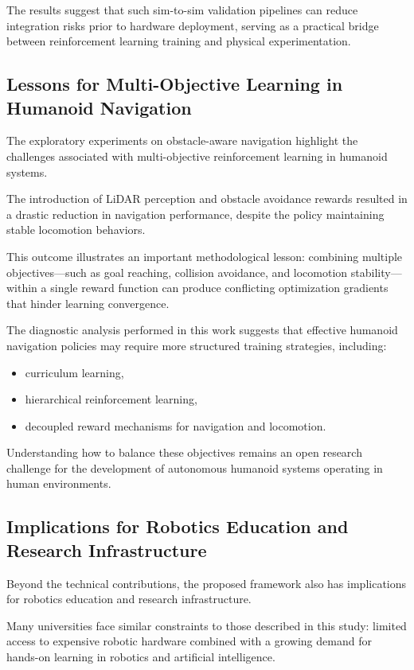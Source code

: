 \documentclass[pdflatex,sn-mathphys-num]{sn-jnl}%
\theoremstyle{thmstyleone}%
\theoremstyle{thmstyletwo}%
\theoremstyle{thmstylethree}%
\begin{document}
The results suggest that such sim-to-sim validation pipelines can reduce integration risks prior to hardware deployment, serving as a practical bridge between reinforcement learning training and physical experimentation.

\subsection{Lessons for Multi-Objective Learning in Humanoid Navigation}
The exploratory experiments on obstacle-aware navigation highlight the challenges associated with multi-objective reinforcement learning in humanoid systems.

The introduction of LiDAR perception and obstacle avoidance rewards resulted in a drastic reduction in navigation performance, despite the policy maintaining stable locomotion behaviors.

This outcome illustrates an important methodological lesson: combining multiple objectives—such as goal reaching, collision avoidance, and locomotion stability—within a single reward function can produce conflicting optimization gradients that hinder learning convergence.

The diagnostic analysis performed in this work suggests that effective humanoid navigation policies may require more structured training strategies, including:
\begin{itemize}
    \item curriculum learning,
    \item hierarchical reinforcement learning,
    \item decoupled reward mechanisms for navigation and locomotion.
\end{itemize} 

Understanding how to balance these objectives remains an open research challenge for the development of autonomous humanoid systems operating in human environments.

\subsection{Implications for Robotics Education and Research Infrastructure}
Beyond the technical contributions, the proposed framework also has implications for robotics education and research infrastructure.

Many universities face similar constraints to those described in this study: limited access to expensive robotic hardware combined with a growing demand for hands-on learning in robotics and artificial intelligence.
\end{document}

